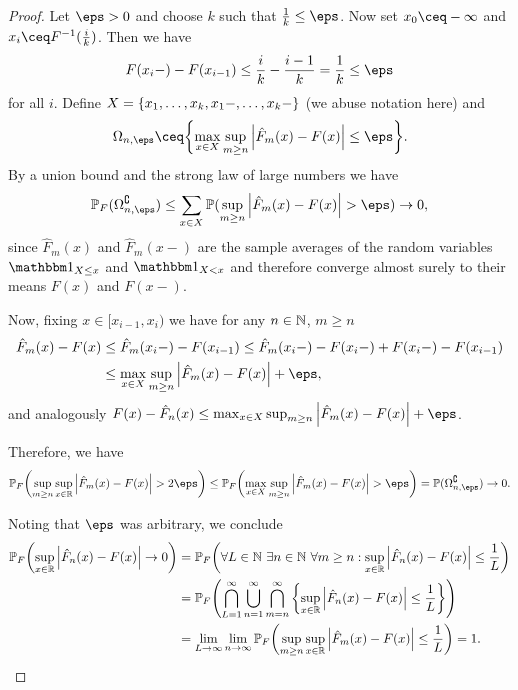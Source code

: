 	
\begin{proof}
    Let $\eps > 0$ and choose $k$ such that $\frac1k \leq \eps$. Now set $x_0 \ceq -\infty$ and $x_i \ceq F^{-1}(\frac ik)$. 
   Then we have 
    \[
    F(x_i-) - F(x_{i-1}) \leq \frac ik - \frac{i-1}{k} = \frac1k \leq \eps
    \]
    for all $i$. Define $X = \qty{x_1, \dotsc, x_k, x_1-, \dotsc, x_k-}$ (we abuse notation here) and 
    \[
    \Omega_{n, \eps} \ceq \qty{\max_{x \in X} \sup_{m \geq n} \abs{\hat F_m(x) - F(x)} \leq \eps}. 
    \]
    By a union bound and the strong law of large numbers we have
    \[
    \PP_F(\Omega_{n, \eps}\C) \leq \sum_{x \in X} \PP(\sup_{m \geq n} \abs{\hat F_m(x) - F(x)} > \eps) \to 0, 
    \]
    since $\hat F_m(x)$ and $\hat F_m(x-)$ are the sample averages of the random variables $\ind_{X \leq x}$ and $\ind_{X < x}$ and therefore converge almost surely to their means $F(x)$ and $F(x-)$. 
    
    Now, fixing $x \in [x_{i-1}, x_i)$ we have for any $n \in \mathbb N$, $m \geq n$
    \begin{align*}
    \hat F_m(x) - F(x) &\leq \hat F_m(x_i-) - F(x_{i-1}) \leq \hat F_m(x_i-) - F(x_i-) + F(x_i-) - F(x_{i-1}) \\
    &\leq \max_{x \in X} \sup_{m \geq n} \abs{\hat F_m(x) - F(x)} + \eps, 
        \end{align*}
    and analogously $F(x) - \hat F_n(x) \leq \max_{x \in X}\sup_{m \geq n} \abs{\hat F_m(x) - F(x)} + \eps$.
    
    Therefore, we have 
    \begin{align*}
    	\PP_F\qty(\sup_{m \geq n} \sup_{x \in \RR} \abs{\hat F_m(x) - F(x)} > 2\eps) \leq \PP_F \qty(\max_{x \in X} \sup_{m \geq n} \abs{\hat F_m(x) - F(x)} > \eps) = \PP(\Omega_{n, \eps}\C) \to 0. 
    \end{align*}

	Noting that $\eps$ was arbitrary, we conclude
	\begin{align*}
		\mathbb P_F\qty(\sup_{x \in \mathbb R} \abs{\hat F_n(x) - F(x)} \to 0) &= \mathbb P_F\qty(\forall L \in \mathbb N \ \exists n \in \mathbb N \ \forall m \geq n : \sup_{x \in \mathbb R} \abs{\hat F_n(x) - F(x)} \leq \frac1L) \\
		&= \mathbb P_F \qty(\bigcap_{L=1}^\infty \bigcup_{n = 1}^\infty  \bigcap_{m = n}^\infty  \qty{\sup_{x \in \mathbb R} \abs{\hat F_n(x) - F(x)} \leq \frac1L}) \\
		&= \lim_{L \to\infty} \lim_{n \to\infty} \mathbb P_F \qty(\sup_{m \geq n} \sup_{x \in \mathbb R} \abs{\hat F_m(x) - F(x)} \leq \frac 1L) = 1. 
	\end{align*}
\end{proof}


